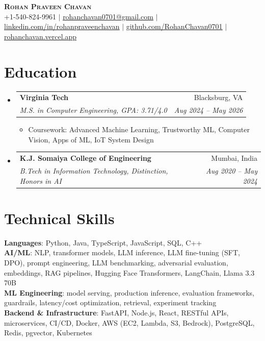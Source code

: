 \documentclass[letterpaper,10pt]{article}
\makeatletter
\newcommand{\resumeItem}[1]{\item\small{#1 \vspace{-2.5pt}}}
\newcommand{\resumeSubheading}[4]{
  \vspace{-2pt}\item
    \begin{tabular*}{0.97\textwidth}[t]{l@{\extracolsep{\fill}}r}
      \textbf{#1} & #2 \\
      \textit{\small#3} & \textit{\small #4} \\
    \end{tabular*}\vspace{-7pt}
}
\newcommand{\resumeSubHeadingListStart}{\begin{itemize}[leftmargin=0.15in, label={}]}
\newcommand{\resumeSubHeadingListEnd}{\end{itemize}}
\newcommand{\resumeItemListStart}{\begin{itemize}}
\newcommand{\resumeItemListEnd}{\end{itemize}\vspace{-5pt}}
\makeatother
\begin{document}
\begin{center}
    \textbf{\Huge \scshape Rohan Praveen Chavan} \\ \vspace{2pt}
    \small +1-540-824-9961 $|$
    \href{mailto:rohanchavan0701@gmail.com}{\underline{rohanchavan0701@gmail.com}} $|$
    \href{https://linkedin.com/in/rohanpraveenchavan}{\underline{linkedin.com/in/rohanpraveenchavan}} $|$
    \href{https://github.com/RohanChavan0701}{\underline{github.com/RohanChavan0701}} $|$
    \href{https://rohanchavan.vercel.app}{\underline{rohanchavan.vercel.app}}
\end{center}

\section{Education}
\resumeSubHeadingListStart
    \resumeSubheading
      {Virginia Tech}{Blacksburg, VA}
      {M.S. in Computer Engineering, GPA: 3.71/4.0}{Aug 2024 -- May 2026}
      \resumeItemListStart
        \resumeItem{Coursework: Advanced Machine Learning, Trustworthy ML, Computer Vision, Apps of ML, IoT System Design}
      \resumeItemListEnd
    \resumeSubheading
      {K.J. Somaiya College of Engineering}{Mumbai, India}
      {B.Tech in Information Technology, Distinction, Honors in AI}{Aug 2020 -- May 2024}
\resumeSubHeadingListEnd

\section{Technical Skills}
\begin{itemize}[leftmargin=0.15in, label={}]
    \small{\item{
     \textbf{Languages}{: Python, Java, TypeScript, JavaScript, SQL, C++} \\
     \textbf{AI/ML}{: NLP, transformer models, LLM inference, LLM fine-tuning (SFT, DPO),
       prompt engineering, LLM benchmarking, adversarial evaluation, embeddings,
       RAG pipelines, Hugging Face Transformers, LangChain, Llama 3.3 70B} \\
     \textbf{ML Engineering}{: model serving, production inference, evaluation frameworks,
       guardrails, latency/cost optimization, retrieval, experiment tracking} \\
     \textbf{Backend \& Infrastructure}{: FastAPI, Node.js, React, RESTful APIs, microservices,
       CI/CD, Docker, AWS (EC2, Lambda, S3, Bedrock), PostgreSQL, Redis, pgvector, Kubernetes}
    }}
\end{itemize}
\end{document}
